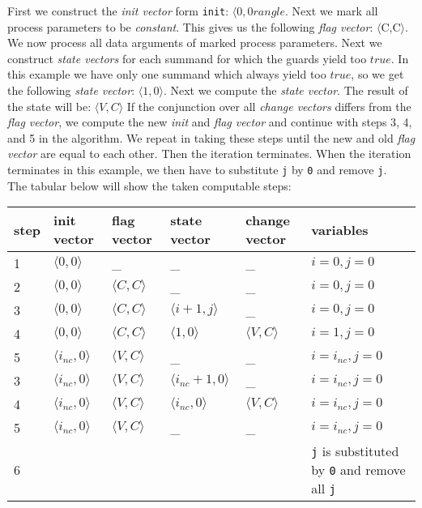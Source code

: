 \documentclass[a4paper,9pt]{article}
\begin{document}
First we construct the \textit{init vector} form \verb"init": $\langle 0 ,0 rangle$. 
Next we mark all  process parameters to be \textit{constant}. This gives us the following \textit{flag vector}: $\langle$C,C$\rangle$.
We now process all data arguments of marked process parameters. 
Next we construct \textit{state vectors} for each summand for which the guards yield too $true$. In this example we have only one summand which always yield too $true$, so we get the following \textit{state vector}: $\langle 1, 0 \rangle$. Next we compute the \textit{state vector}. The result of the state will be: $\langle V, C \rangle$
If the conjunction over all \textit{change vectors} differs from the \textit{flag vector}, we compute the new \textit{init} and \textit{flag vector} and continue with steps 3, 4, and 5 in the algorithm. We repeat in taking these steps until the new and old \textit{flag vector} are equal to each other. Then the iteration terminates. When the iteration terminates in this example, we then have to substitute \verb"j" by \verb"0" and remove \verb"j".\\

The tabular below will show the taken computable steps: \\
\begin{tabular}{|l|l|l|l|l|l|}
\hline
step 	&  init vector 			& flag vector			& state vector 			& change vector 		& variables \\
\hline	
\hline
1 	&  $\langle 0,0 \rangle$ 	& \_				& \_				& \_				& $i=0, j=0 $ \\
\hline
2	&  $\langle 0,0 \rangle$ 	&  $\langle C,C \rangle$ 	& \_				& \_				& $i=0, j=0 $\\
\hline
3	&  $\langle 0,0 \rangle$ 	&  $\langle C,C \rangle$ 	&  $\langle i+1,j \rangle$ 	& \_				& $i=0, j=0 $\\
\hline
4	&  $\langle 0,0 \rangle$ 	&  $\langle C,C \rangle$ 	&  $\langle 1,0 \rangle$ 	&  $\langle V,C \rangle$ 	& $i=1, j=0 $\\
\hline
5	&  $\langle i_{nc},0 \rangle$ 	&  $\langle V,C \rangle$ 	&  \_				& \_ 				&  $i= i_{nc} , j=0$\\
\hline
3	&  $\langle   i_{nc} ,0 \rangle$ 	&  $\langle V,C \rangle$ 	&  $\langle   i_{nc}+1 ,0 \rangle$  			&  \_			 	& $i= i_{nc} , j=0$ \\
\hline
4	&  $\langle   i_{nc} ,0 \rangle$ 	&  $\langle V,C \rangle$ 	&  $\langle   i_{nc} ,0 \rangle$	&  $\langle V,C \rangle$  		& $i= i_{nc} , j=0 $\\
\hline
5	&  $\langle   i_{nc} ,0 \rangle$ 	&  $\langle V,C \rangle$ 	&  \_ 					& \_  					& $i= i_{nc} , j=0 $\\
\hline
6	& 					&				&					&					& \verb"j" is substituted by \verb"0" and remove all \verb"j"\\	
\hline
\end{tabular}\\
\end{document}
